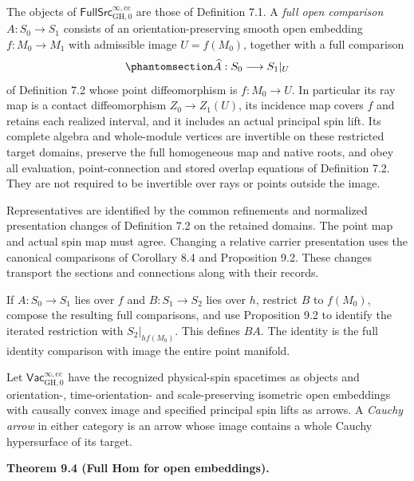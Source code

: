 \documentclass[
  english,
  11pt,
  reqno]{amsart}
\makeatletter
\newcommand{\pandocstatementheading}[1]{%
  \par\addpenalty{\@beginparpenalty}%
  \addvspace{.5\baselineskip plus .2\baselineskip minus .2\baselineskip}%
  {\normalfont\bfseries #1\par}%
  \nobreak\@afterindenttrue\@afterheading
}
\makeatother
\begin{document}
The objects of \(\mathsf{FullSrc}^{\infty,\mathrm{cc}}_{\mathrm{GH},0}\)
are those of Definition 7.1. A \emph{full open comparison}
\(A:S_0\to S_1\) consists of an orientation-preserving smooth open
embedding \(f:M_0\to M_1\) with admissible image \(U=f(M_0)\), together
with a full comparison
\begin{equation}\protect\phantomsection\label{eq:global-source-open-comparison}{
\widehat A:S_0\longrightarrow S_1|_U
}\end{equation} of Definition 7.2 whose point diffeomorphism is
\(f:M_0\to U\). In particular its ray map is a contact diffeomorphism
\(Z_0\to Z_1(U)\), its incidence map covers \(f\) and retains each
realized interval, and it includes an actual principal spin lift. Its
complete algebra and whole-module vertices are invertible on these
restricted target domains, preserve the full homogeneous map and native
roots, and obey all evaluation, point-connection and stored overlap
equations of Definition 7.2. They are not required to be invertible over
rays or points outside the image.

Representatives are identified by the common refinements and normalized
presentation changes of Definition 7.2 on the retained domains. The
point map and actual spin map must agree. Changing a relative carrier
presentation uses the canonical comparisons of Corollary 8.4 and
Proposition 9.2. These changes transport the sections and connections
along with their records.

If \(A:S_0\to S_1\) lies over \(f\) and \(B:S_1\to S_2\) lies over
\(h\), restrict \(B\) to \(f(M_0)\), compose the resulting full
comparisons, and use Proposition 9.2 to identify the iterated
restriction with \(S_2|_{hf(M_0)}\). This defines \(B A\). The identity
is the full identity comparison with image the entire point manifold.

Let \(\mathsf{Vac}^{\infty,\mathrm{cc}}_{\mathrm{GH},0}\) have the
recognized physical-spin spacetimes as objects and orientation-,
time-orientation- and scale-preserving isometric open embeddings with
causally convex image and specified principal spin lifts as arrows. A
\emph{Cauchy arrow} in either category is an arrow whose image contains
a whole Cauchy hypersurface of its target.

\pandocstatementheading{\protect{}\label{thm:global-full-source-embedding-hom}Theorem 9.4 (Full Hom for open embeddings).}
\end{document}
